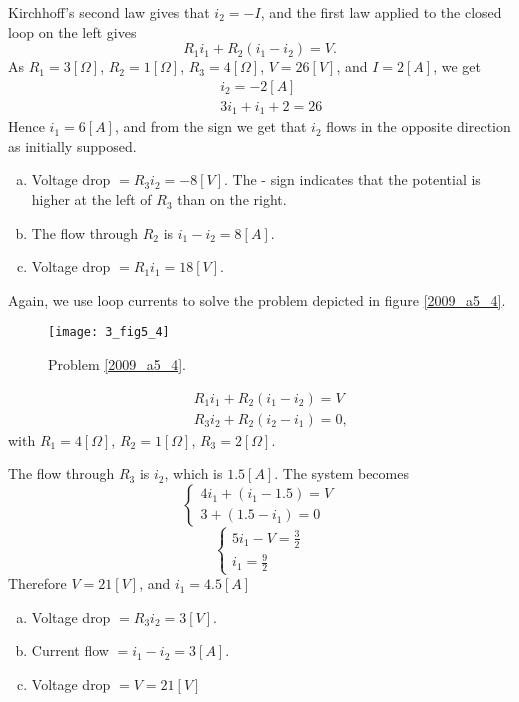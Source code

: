 Kirchhoff's second law gives that $i_2=-I$, and the first law applied to the closed loop on the left gives
$$
R_1i_1+R_2(i_1-i_2)=V.
$$
As $R_1 = 3[\Omega]$, $R_2=1[\Omega]$, $R_3 = 4[\Omega]$, $V=26[V]$, and $I=2[A]$, we get
\begin{eqnarray}
  &&i_2 = -2[A] \\
	&&3i_1+i_1+2=26
\end{eqnarray}
Hence $i_1 = 6[A]$, and from the sign we get that $i_2$ flows in the opposite direction as initially supposed.
\begin{enumerate}[a)]
\item Voltage drop $=R_3i_2=-8[V]$. The - sign indicates that the potential is higher at the left of $R_3$ than on the right.
\item The flow through $R_2$ is $i_1-i_2=8[A]$.
\item Voltage drop $=R_1i_1=18[V]$.
\end{enumerate}



\vspace{2mm}
Again, we use loop currents to solve the problem depicted in figure \ref{2009_a5_4}.
\begin{figure}
\centerline{\texttt{[image: 3\_fig5\_4]}}
\caption{Problem \ref{2009_a5_4}.
\label{fig_a5_4}}
\end{figure}

\begin{eqnarray*}
  &&R_1i_1 + R_2(i_1-i_2) = V \\
	&&R_3i_2 + R_2(i_2-i_1) = 0,
\end{eqnarray*}
% 
with $R_1 = 4[\Omega]$, $R_2 = 1[\Omega]$, $R_3 = 2[\Omega]$.

The flow through $R_3$ is $i_2$, which is $1.5[A]$. The system becomes
$$
\left\{\begin{array}{c}4i_1+(i_1-1.5)=V \\ 3+(1.5-i_1)=0 \end{array}\right.
$$
$$
\left\{\begin{array}{c}5i_1-V=\frac{3}{2} \\ i_1=\frac{9}{2} \end{array}\right.
$$
Therefore $V=21[V]$, and $i_1=4.5[A]$
\begin{enumerate}[a)]
\item Voltage drop $=R_3i_2=3[V]$.
\item Current flow $=i_1-i_2=3[A]$.
\item Voltage drop $=V=21[V]$
\end{enumerate}

